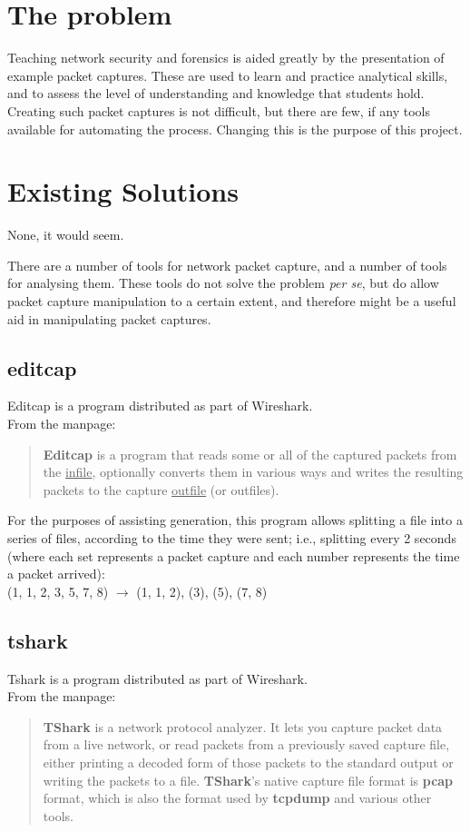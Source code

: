 \documentclass[10pt,a4paper,notitlepage,twoside]{report}
\begin{document}
\section{The problem}
Teaching network security and forensics is aided greatly by the presentation of example packet captures. These are used to learn and practice analytical skills, and to assess the level of understanding and knowledge that students hold.
Creating such packet captures is not difficult, but there are few, if any tools available for automating the process. Changing this is the purpose of this project.

\pagebreak

\section{Existing Solutions}
\label{sec:existing}
None, it would seem.

There are a number of tools for network packet capture, and a number of tools for analysing them. These tools do not solve the problem \emph{per se}, but do allow packet capture manipulation to a certain extent, and therefore might be a useful aid in manipulating packet captures.

\subsection{editcap}
Editcap is a program distributed as part of Wireshark.\\
From the manpage\cite{editcap-man}:
\begin{quote}
\textbf{Editcap} is a program that reads some or all of the captured packets from the \underline{infile}, optionally converts them in various ways and writes the resulting packets to the capture \underline{outfile} (or outfiles).
\end{quote}

For the purposes of assisting generation, this program allows splitting a file into a series of files, according to the time they were sent; i.e., splitting every 2 seconds (where each set represents a packet capture and each number represents the time a packet arrived):\\
\indent (1, 1, 2, 3, 5, 7, 8) $\rightarrow$ (1, 1, 2), (3), (5), (7, 8)

\subsection{tshark}
Tshark is a program distributed as part of Wireshark.\\
From the manpage\cite{tshark-man}:
\begin{quote}
\textbf{TShark} is a network protocol analyzer. It lets you capture packet data from a live network, or read packets from a previously saved capture file, either printing a decoded form of those packets to the standard output or writing the packets to a file.  \textbf{TShark}'s native capture file format is \textbf{pcap} format, which is also the format used by \textbf{tcpdump} and various other tools.
\end{quote}
\end{document}
